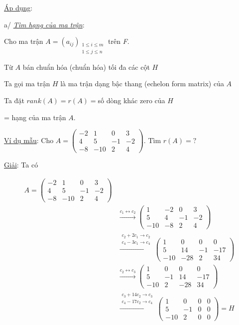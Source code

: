 \documentclass[12pt,a4paper]{article} \usepackage[utf8]{inputenc} \usepackage[T5]{fontenc} \usepackage[vietnamese]{babel} \usepackage{amsmath, amssymb, amsfonts} \usepackage{ulem}
\begin{document}
\ul{Áp dụng}:

a/ \emph{\ul{Tìm hạng của ma trận}}:

Cho ma trận $A = (a_{ij})_{\substack{1 \le i \le m \\ 1 \le j \le n}}$ trên \emph{F}.

Từ $A$ bán chuẩn hóa (chuẩn hóa) tối đa các cột $H$

Ta gọi ma trận $H$ là ma trận dạng bậc thang (echelon form matrix) của $A$

Ta đặt $rank(A) = r(A) =$số dòng khác zero của $H$

= hạng của ma trận $A$.

\ul{Ví dụ mẫu}: Cho
$A = \begin{pmatrix} -2 & 1 & 0 & 3 \\ 4 & 5 & -1 & -2 \\ -8 & -10 & 2 & 4 \end{pmatrix}$. Tìm
$r(A) = ?$

\ul{Giải}: Ta có

\begin{align*}
A = \begin{pmatrix} -2 & 1 & 0 & 3 \\ 4 & 5 & -1 & -2 \\ -8 & -10 & 2 & 4 \end{pmatrix}  \\
&\xrightarrow{c_1 \leftrightarrow c_2} \begin{pmatrix} 1 & -2 & 0 & 3 \\ 5 & 4 & -1 & -2 \\ -10 & -8 & 2 & 4 \end{pmatrix} \\
&\xrightarrow{\substack{c_2 + 2c_1 \to c_2 \\ c_4 - 3c_1 \to c_4} } \begin{pmatrix} 1 & 0 & 0 & 0 \\ 5 & 14 & -1 & -17 \\ -10 & -28 & 2 & 34 \end{pmatrix} \\
&\xrightarrow{c_2 \leftrightarrow c_3} \begin{pmatrix} 1 & 0 & 0 & 0 \\ 5 & -1 & 14 & -17 \\ -10 & 2 & -28 & 34 \end{pmatrix} \\
&\xrightarrow{\substack{c_3 + 14c_2 \to c_3 \\ c_4 - 17c_2 \to c_4} } \begin{pmatrix} 1 & 0 & 0 & 0 \\ 5 & -1 & 0 & 0 \\ -10 & 2 & 0 & 0 \end{pmatrix} = H
\end{align*}
\end{document}
